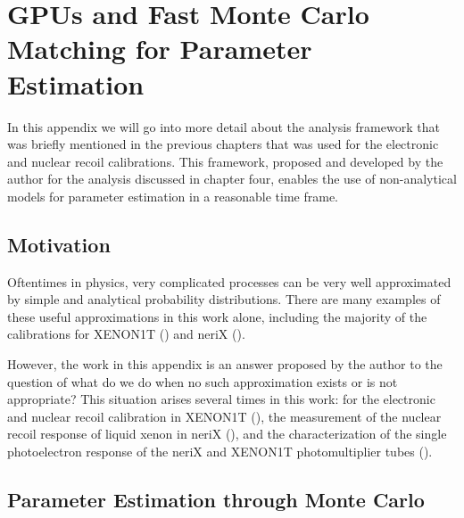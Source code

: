 

\pagestyle{cu}
\graphicspath{{./AppendixA/images/}}

\chapter[GPUs and Fast Monte Carlo Matching for Parameter Estimation][GPUs and Fast Monte Carlo Matching for Parameter Estimation]{GPUs and Fast Monte Carlo Matching for Parameter Estimation}
\label{app:gpus}

In this appendix we will go into more detail about the analysis framework that was briefly mentioned in the previous chapters that was used for the electronic and nuclear recoil calibrations.  This framework, proposed and developed by the author for the analysis discussed in chapter four, enables the use of non-analytical models for parameter estimation in a reasonable time frame.  



\section{Motivation}

Oftentimes in physics, very complicated processes can be very well approximated by simple and analytical probability distributions.  There are many examples of these useful approximations in this work alone, including the majority of the calibrations for XENON1T () and neriX ().

However, the work in this appendix is an answer proposed by the author to the question of what do we do when no such approximation exists or is not appropriate?  This situation arises several times in this work: for the electronic and nuclear recoil calibration in XENON1T (), the measurement of the nuclear recoil response of liquid xenon in neriX (), and the characterization of the single photoelectron response of the neriX and XENON1T photomultiplier tubes ().


\section{Parameter Estimation through Monte Carlo}

